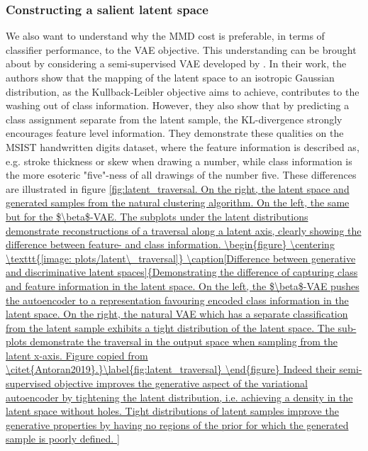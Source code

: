 \subsubsection{Constructing a salient latent space}

We also want to understand why the MMD cost is preferable, in terms of classifier performance, to the VAE objective. This understanding can be brought about by considering a semi-supervised VAE developed by \citet{Antoran2019}. In their work, the authors show that the mapping of the latent space to an isotropic Gaussian distribution, as the Kullback-Leibler objective aims to achieve, contributes to the washing out of class information. However, they also show that by predicting a class assignment separate from the latent sample, the KL-divergence strongly encourages feature level information. They demonstrate these qualities on the MSIST handwritten digits dataset, where the feature information is described as, e.g. stroke thickness or skew when drawing a number, while class information is the more esoteric "five"-ness of all drawings of the number five. These differences are illustrated in figure \ref{fig:latent_traversal. On the right, the latent space and generated samples from the natural clustering algorithm. On the left, the same but for the $\beta$-VAE. The subplots under the latent distributions demonstrate reconstructions of a traversal along a latent axis, clearly showing the difference between feature- and class information. 



\begin{figure}
\centering
\texttt{[image: plots/latent\_traversal]}
\caption[Difference between generative and discriminative latent spaces]{Demonstrating the difference of capturing class and feature information in the latent space. On the left, the $\beta$-VAE pushes the autoencoder to a representation favouring encoded class information in the latent space. On the right, the natural VAE which has a separate classification from the latent sample exhibits a tight distribution of the latent space. The sub-plots demonstrate the traversal in the output space when sampling from the latent x-axis. Figure copied from \citet{Antoran2019}.}\label{fig:latent_traversal}
\end{figure}

Indeed their semi-supervised objective improves the generative aspect of the variational autoencoder by tightening the latent distribution, i.e. achieving a density in the latent space without holes. Tight distributions of latent samples improve the generative properties by having no regions of the prior for which the generated sample is poorly defined. 

}
